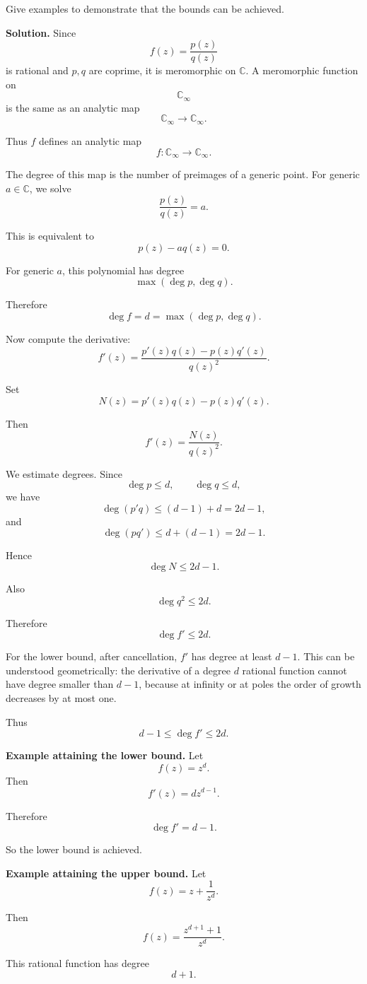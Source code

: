 \documentclass[12pt,a4paper]{article}
\theoremstyle{notespace}
\begin{document}
Give examples to demonstrate that the bounds can be achieved.

\textbf{Solution.}
Since
\[
f(z)=\frac{p(z)}{q(z)}
\]
is rational and \(p,q\) are coprime, it is meromorphic on \(\mathbb C\). A meromorphic function on
\[
\mathbb C_\infty
\]
is the same as an analytic map
\[
\mathbb C_\infty\to\mathbb C_\infty.
\]

Thus \(f\) defines an analytic map
\[
f:\mathbb C_\infty\to\mathbb C_\infty.
\]

The degree of this map is the number of preimages of a generic point. For generic \(a\in\mathbb C\), we solve
\[
\frac{p(z)}{q(z)}=a.
\]

This is equivalent to
\[
p(z)-a q(z)=0.
\]

For generic \(a\), this polynomial has degree
\[
\max(\deg p,\deg q).
\]

Therefore
\[
\deg f=d=\max(\deg p,\deg q).
\]

Now compute the derivative:
\[
f'(z)=\frac{p'(z)q(z)-p(z)q'(z)}{q(z)^2}.
\]

Set
\[
N(z)=p'(z)q(z)-p(z)q'(z).
\]

Then
\[
f'(z)=\frac{N(z)}{q(z)^2}.
\]

We estimate degrees. Since
\[
\deg p\leq d,\qquad \deg q\leq d,
\]
we have
\[
\deg(p'q)\leq (d-1)+d=2d-1,
\]
and
\[
\deg(pq')\leq d+(d-1)=2d-1.
\]

Hence
\[
\deg N\leq 2d-1.
\]

Also
\[
\deg q^2\leq 2d.
\]

Therefore
\[
\deg f'\leq 2d.
\]

For the lower bound, after cancellation, \(f'\) has degree at least \(d-1\). This can be understood geometrically: the derivative of a degree \(d\) rational function cannot have degree smaller than \(d-1\), because at infinity or at poles the order of growth decreases by at most one.

Thus
\[
d-1\leq \deg f'\leq 2d.
\]

\textbf{Example attaining the lower bound.}
Let
\[
f(z)=z^d.
\]
Then
\[
f'(z)=d z^{d-1}.
\]

Therefore
\[
\deg f'=d-1.
\]

So the lower bound is achieved.

\textbf{Example attaining the upper bound.}
Let
\[
f(z)=z+\frac{1}{z^d}.
\]

Then
\[
f(z)=\frac{z^{d+1}+1}{z^d}.
\]

This rational function has degree
\[
d+1.
\]
\end{document}
